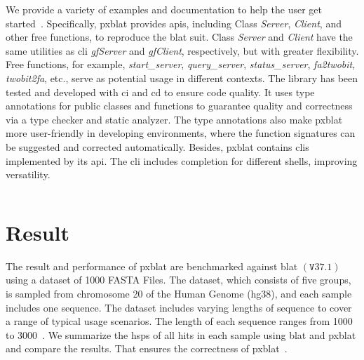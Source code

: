 We provide a variety of examples and documentation to help the user get started~.
Specifically, \gls{pxblat} provides \glspl{api}, including Class \emph{Server}, \emph{Client}, and other free functions, to reproduce the \gls{blat} suit.
Class \emph{Server} and \emph{Client} have the same utilities as \gls{cli} \emph{gfServer} and \emph{gfClient}, respectively, but with greater flexibility.
Free functions, for example, \emph{start\_server}, \emph{query\_server}, \emph{status\_server}, \emph{fa2twobit}, \emph{twobit2fa}, etc., serve as potential usage in different contexts.
The library has been tested and developed with \gls{ci} and \gls{cd} to ensure code quality.
It uses type annotations for public classes and functions to guarantee quality and correctness via a type checker and static analyzer.
The type annotations also make \gls{pxblat} more user-friendly in developing environments, where the function signatures can be suggested and corrected automatically.
Besides, \gls{pxblat} contains \glspl{cli} implemented by its \gls{api}.
The \gls{cli} includes completion for different shells, improving versatility.

\begin{listing}
	\inputminted[linenos, breaklines]{python}{codes/example1.py}
	\label{listing:example}
\end{listing}


\section*{Result}\label{sec:result}

The result and performance of \gls{pxblat} are benchmarked against \gls{blat} \(\left(\mathtt{V}37.1\right)\) using a dataset of \num[round-mode=places, round-precision=0]{1000} FASTA Files.
The dataset, which consists of five groups, is sampled from chromosome \num[round-mode=places, round-precision=0]{20} of the Human Genome (hg38), and each sample includes one sequence.
The dataset includes varying lengths of sequence to cover a range of typical usage scenarios.
The length of each sequence ranges from \num[round-mode=places, round-precision=0]{1000} to \num[round-mode=places, round-precision=0]{3000}~.
We summarize the \glspl{hsp} of all hits in each sample using \gls{blat} and \gls{pxblat} and compare the results.
That ensures the correctness of \gls{pxblat}~.

